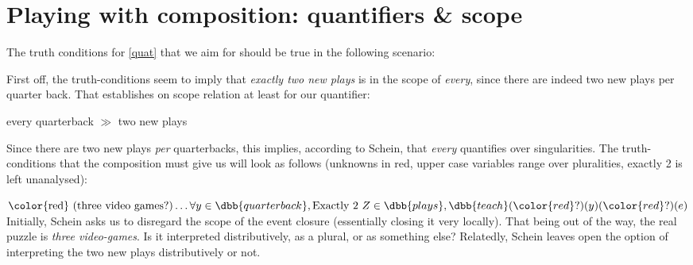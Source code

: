 \section{Playing with composition: quantifiers \& scope}

The truth conditions for \cref{quat} that we aim for should be true in the following scenario:

\ex \label{scenario}
\begin{center}
\end{center}
\xe
%


First off, the truth-conditions seem to imply that \emph{exactly two new plays} is in the scope of \emph{every}, since there are indeed two new plays per quarter back. That establishes on scope relation at least for our quantifier:

\begin{center}
every quarterback $\gg$ two new plays
\end{center}
%
Since there are two new plays \emph{per} quarterbacks, this implies, according to Schein, that \emph{every} quantifies over singularities. The truth-conditions that the composition must give us will look as follows (unknowns in red, upper case variables range over pluralities, exactly 2 is left unanalysed):

\ex
$\text{\color{red} (three video games?)} \ldots \forall y\in \dbb{quarterback}, \text{Exactly 2 } Z\in \dbb{plays},  \dbb{teach}({\color{red} ?})(y)({\color{red} ?})(e)$
\xe
%
Initially, Schein asks us to disregard the scope of the event closure (essentially closing it very locally). That being out of the way,
the real puzzle is \emph{three video-games}. Is it interpreted distributively, as a plural, or as something else? Relatedly, Schein leaves open the option of interpreting the two new plays distributively or not.

